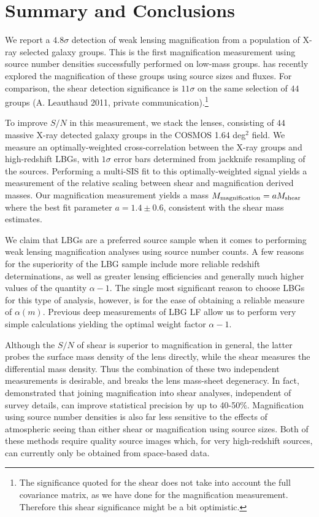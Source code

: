 \section{Summary and Conclusions}
\label{summary}
We report a $4.8 \sigma$ detection of weak lensing magnification from a population of X-ray selected galaxy groups. This is the first magnification measurement using source number densities successfully performed on low-mass groups. \citet{Schmidt12} has recently explored the magnification of these groups using source sizes and fluxes.  For comparison, the shear detection significance is $11 \sigma$ on the same selection of $44$ groups (A. Leauthaud 2011, private communication).\footnote{The significance quoted for the shear does not take into account the full covariance matrix, as we have done for the magnification measurement.  Therefore this shear significance might be a bit optimistic.}

To improve $S/N$ in this measurement, we stack the lenses, consisting of $44$ massive X-ray detected galaxy groups in the \ac{COSMOS} 1.64 deg$^2$ field.  We measure an optimally-weighted cross-correlation between the X-ray groups and high-redshift \ac{LBG}s, with $1 \sigma$ error bars determined from jackknife resampling of the sources. Performing a multi-\ac{SIS} fit to this optimally-weighted signal yields a measurement of the relative scaling between shear and magnification derived masses. Our magnification measurement yields a mass $M_{\rm magnification}=aM_{\rm shear}$ where the best fit parameter $a=1.4 \pm 0.6$, consistent with the shear mass estimates.

We claim that \ac{LBG}s are a preferred source sample when it comes to performing weak lensing magnification analyses using source number counts.  A few reasons for the superiority of the \ac{LBG} sample include more reliable redshift determinations, as well as greater lensing efficiencies and generally much higher values of the quantity $\alpha-1$.  The single most significant reason to choose \ac{LBG}s for this type of analysis, however, is for the ease of obtaining a reliable measure of $\alpha(m)$.  Previous deep measurements of \ac{LBG} \ac{LF} allow us to perform very simple calculations yielding the optimal weight factor $\alpha-1$.

Although the $S/N$ of shear is superior to magnification in general, the latter probes the surface mass density of the lens directly, while the shear measures the differential mass density.  Thus the combination of these two independent measurements is desirable, and breaks the lens mass-sheet degeneracy. In fact, \citet{RozoSchmidt10} demonstrated that joining magnification into shear analyses, independent of survey details, can improve statistical precision by up to 40-50\%. Magnification using source number densities is also far less sensitive to the effects of atmospheric seeing than either shear or magnification using source sizes.  Both of these methods require quality source images which, for very high-redshift sources, can currently only be obtained from space-based data.

